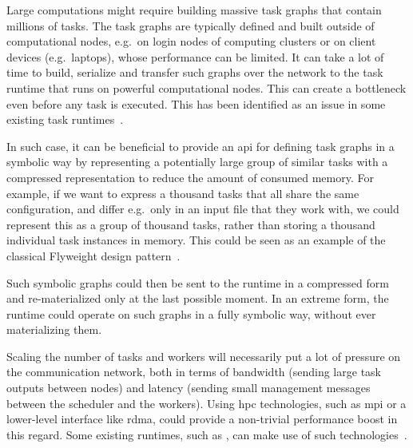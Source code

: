 \begin{description}[wide=0pt]
	\item[Task graph materialization] Large computations might require building massive task graphs that contain millions of tasks. The
		task graphs are typically defined and built outside of computational nodes, e.g.\ on login nodes of
		computing clusters or on client devices (e.g.\ laptops), whose performance can be limited. It can
		take a lot of time to build, serialize and transfer such graphs over the network to the task
		runtime that runs on powerful computational nodes. This can create a bottleneck even before any
		task is executed. This has been identified as an issue in some existing task
		runtimes~\cite{dask-client-perf}.

		In such case, it can be beneficial to provide an \gls{api} for defining task graphs
		in a symbolic way by representing a potentially large group of similar tasks with a compressed
		representation to reduce the amount of consumed memory. For example, if we want to express a
		thousand tasks that all share the same configuration, and differ e.g.\ only in an input file that
		they work with, we could represent this as a group of thousand tasks, rather than storing a
		thousand individual task instances in memory. This could be seen as an example of the classical
		Flyweight design pattern~\cite{gof}.

		Such symbolic graphs could then be sent to the runtime in a compressed form and re-materialized
		only at the last possible moment. In an extreme form, the runtime could operate on such graphs in a
		fully symbolic way, without ever materializing them.
	\item[Communication overhead] Scaling the number of tasks and workers will necessarily put a lot of pressure on the communication
		network, both in terms of bandwidth (sending large task outputs between nodes) and latency (sending
		small management messages between the scheduler and the workers). Using \gls{hpc}
		technologies, such as \gls{mpi} or a lower-level interface like
		\gls{rdma}, could provide a non-trivial performance boost in this regard. Some
		existing runtimes, such as \dask{}, can make use of such
		technologies~\cite{dask-ucx}.


\end{description}
